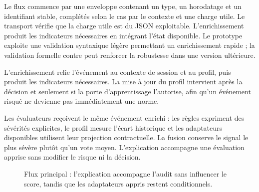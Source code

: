 \documentclass[11pt,a4paper,oneside]{report}
\theoremstyle{definition}
\theoremstyle{plain}
\begin{document}
Le flux commence par une enveloppe contenant un type, un horodatage et un
identifiant stable, complétés selon le cas par le contexte et une charge utile.
Le transport vérifie que la charge utile est du JSON exploitable. L'enrichissement
produit les indicateurs nécessaires en intégrant l'état disponible. Le prototype
exploite une validation syntaxique légère permettant un enrichissement rapide ;
la validation formelle contre  peut
renforcer la robustesse dans une version ultérieure.

L'enrichissement relie l'événement au contexte de session et au profil, puis
produit les indicateurs nécessaires. La mise à jour du profil intervient après
la décision et seulement si la porte d'apprentissage l'autorise, afin qu'un
événement risqué ne devienne pas immédiatement une norme.

Les évaluateurs reçoivent le même événement enrichi : les règles expriment des
sévérités explicites, le profil mesure l'écart historique et les adaptateurs
disponibles utilisent leur projection contractuelle. La fusion conserve le
signal le plus sévère plutôt qu'un vote moyen. L'explication accompagne une
évaluation apprise sans modifier le risque ni la décision.

\begin{figure}[H]
\centering
{}
\caption{Flux principal : l'explication accompagne l'audit sans influencer le
score, tandis que les adaptateurs appris restent conditionnels.}
\label{fig:method-dataflow}
\end{figure}
\end{document}
